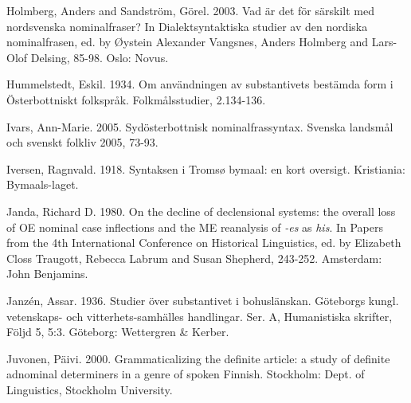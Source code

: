 \begin{styleBodytextC}
Holmberg, Anders and Sandström, Görel. 2003. Vad är det för särskilt med nordsvenska nominalfraser? In Dialektsyntaktiska studier av den nordiska nominalfrasen, ed. by Øystein Alexander Vangsnes, Anders Holmberg and Lars-Olof Delsing, 85-98. Oslo: Novus.

\end{styleBodytextC}

\begin{styleBodytextC}
Hummelstedt, Eskil. 1934. Om användningen av substantivets bestämda form i Österbottniskt folkspråk. Folkmålsstudier, 2.134-136.

\end{styleBodytextC}

\begin{styleBodytextC}
Ivars, Ann-Marie. 2005. Sydösterbottnisk nominalfrassyntax. Svenska landsmål och svenskt folkliv 2005, 73-93.

\end{styleBodytextC}

\begin{styleBodytextC}
Iversen, Ragnvald. 1918. Syntaksen i Tromsø bymaal: en kort oversigt. Kristiania: Bymaals-laget.

\end{styleBodytextC}

\begin{styleBodytextC}
Janda, Richard D. 1980. On the decline of declensional systems: the overall loss of OE nominal case inflections and the ME reanalysis of \textit{{}-es} as \textit{his}. In Papers from the 4th International Conference on Historical Linguistics, ed. by Elizabeth Closs Traugott, Rebecca Labrum and Susan Shepherd, 243-252. Amsterdam: John Benjamins.

\end{styleBodytextC}

\begin{styleBodytextC}
Janzén, Assar. 1936. Studier över substantivet i bohuslänskan. Göteborgs kungl. vetenskaps- och vitterhets-samhälles handlingar. Ser. A, Humanistiska skrifter, Följd 5, 5:3. Göteborg: Wettergren \& Kerber.

\end{styleBodytextC}

\begin{styleBodytextC}
Juvonen, Päivi. 2000. Grammaticalizing the definite article: a study of definite adnominal determiners in a genre of spoken Finnish. Stockholm: Dept. of Linguistics, Stockholm University.

\end{styleBodytextC}

